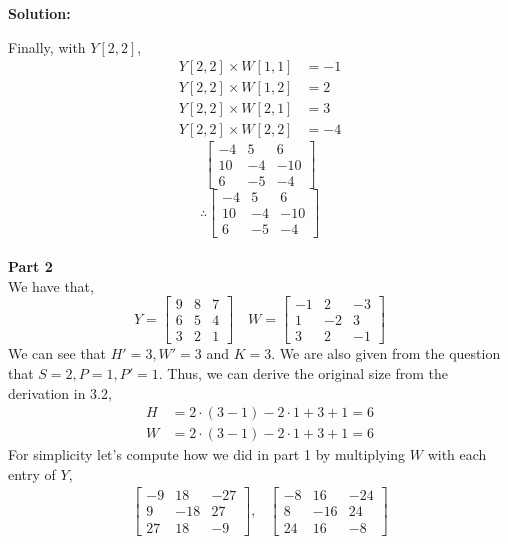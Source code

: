 \documentclass{article}
\newenvironment{solution}
  {\par\noindent\textbf{Solution:}\par}
  {\par}
\begin{document}
\begin{solution}
Finally, with $Y[2,2]$,
\[
\begin{aligned}
  Y[2,2] \times W[1,1] &= -1 \\ 
  Y[2,2] \times W[1,2] &=2 \\ 
  Y[2,2] \times W[2,1] &= 3 \\ 
  Y[2,2] \times W[2,2] &= -4
\end{aligned}
\]
\[
\begin{bmatrix}
  -4 & 5 & 6 \\ 
  10 & -4 & -10 \\ 
  6 & -5 & -4
\end{bmatrix}
\]
\[ 
  \therefore \begin{bmatrix}
  -4 & 5 & 6 \\ 
  10 & -4 & -10 \\ 
  6 & -5 & -4
\end{bmatrix}
\] 
\\ 
\textbf{Part 2}
\\ 
  We have that,
  \[ Y= 
    \begin{bmatrix}
      9 & 8 & 7 \\ 
      6 & 5 & 4 \\ 
      3 & 2 & 1
    \end{bmatrix} \quad  W= \begin{bmatrix}
      -1 & 2 & -3 \\ 
      1 & -2 & 3 \\ 
      3 & 2 & -1
    \end{bmatrix}
  \]
 We can see that $H'=3,W'=3$ and $K=3$. We are also given from the question that $S=2,P=1,P'=1$.
Thus, we can derive the original size from the derivation in 3.2,
\[
  \begin{aligned}
    H &= 2 \cdot (3 - 1) - 2 \cdot 1 + 3 + 1 = 6 \\ 
    W &= 2 \cdot (3 - 1) - 2 \cdot 1 +3   + 1  = 6  
  \end{aligned}
\]
For simplicity let's compute how we did in part 1 by multiplying $W$ with each entry of $Y$,
\[
  \begin{aligned}
\begin{bmatrix}
-9 & 18 & -27 \\
9 & -18 & 27 \\
27  & 18  & -9
\end{bmatrix} ,& \begin{bmatrix}
-8 & 16 & -24 \\
8 & -16 & 24 \\
24 & 16 &  -8
\end{bmatrix} \\ 

\end{aligned}\]
\end{solution}
\end{document}
